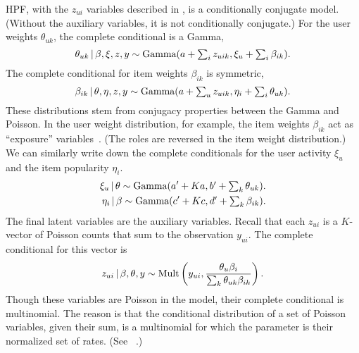 HPF, with the $z_{ui}$ variables described in , is a
conditionally conjugate model.  (Without the auxiliary variables, it
is not conditionally conjugate.) For the user weights $\theta_{uk}$,
the complete conditional is a Gamma,
\begin{equation}
  \label{eq:user-weight-cc}
  \theta_{uk} \,\vert\, \beta, \xi, z, y \sim
  \textrm{Gamma}(a + \textstyle \sum_{i} z_{uik}, \xi_u + \sum_{i} \beta_{ik}).
\end{equation}
The complete conditional for item weights $\beta_{ik}$ is symmetric,
\begin{equation}
  \label{eq:item-weight-cc}
  \beta_{ik} \,\vert\, \theta, \eta, z, y \sim
  \textrm{Gamma}(a + \textstyle \sum_{u} z_{uik}, \eta_i + \sum_{i} \theta_{uk}).
\end{equation}
These distributions stem from conjugacy properties between the Gamma
and Poisson. In the user weight distribution, for example, the item
weights $\beta_{ik}$ act as ``exposure'' variables~\cite{Gelman:1995}.
(The roles are reversed in the item weight distribution.) We can
similarly write down the complete conditionals for the user activity
$\xi_u$ and the item popularity $\eta_i$.
\begin{align*}
  \label{eq:user-weight-cc}
  \xi_{u} \,\vert\, \theta \sim
  \textrm{Gamma}(a' + \textstyle Ka, b' + \sum_{k} \theta_{uk}).\nonumber\\
  \eta_{i} \,\vert\, \beta \sim
  \textrm{Gamma}(c' + \textstyle Kc, d' + \sum_{k} \beta_{ik}).\nonumber\\
\end{align*}
The final latent variables are the auxiliary variables.  Recall that
each $z_{ui}$ is a $K$-vector of Poisson counts that sum to the
observation $y_{ui}$. The complete conditional for this vector is
\begin{equation}
  \label{eq:aux-cc}
  z_{ui} \,\vert\, \beta, \theta, y \sim \textrm{Mult}\left(y_{ui}, \frac{\theta_{u} 
      \beta_{i}}{\textstyle \sum_{k} \theta_{uk} \beta_{ik}}\right).
\end{equation}
Though these variables are Poisson in the model, their complete
conditional is multinomial.  The reason is that the conditional
distribution of a set of Poisson variables, given their sum, is a
multinomial for which the parameter is their normalized set of
rates. (See ~\cite{Johnson:2005, Cemgil:2009}.)

